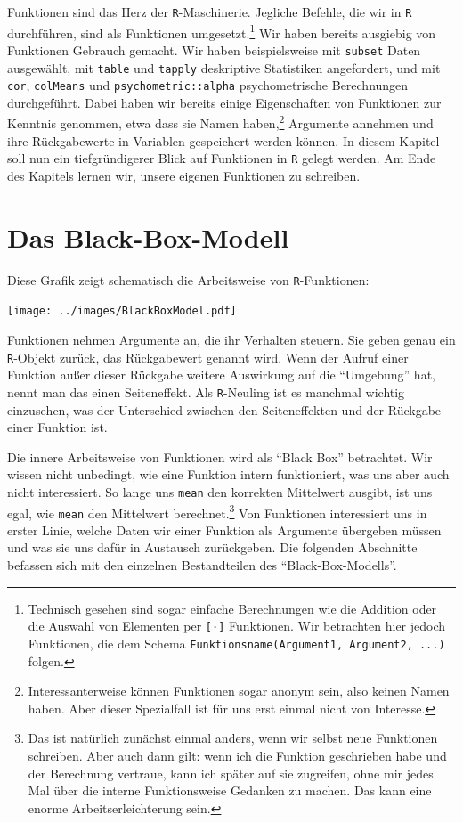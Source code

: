 \documentclass[12pt,]{tufte-book}
\theoremstyle{definition}
\theoremstyle{definition}
\theoremstyle{definition}
\theoremstyle{remark}
\begin{document}
Funktionen sind das Herz der \texttt{R}-Maschinerie. Jegliche Befehle,
die wir in \texttt{R} durchführen, sind als Funktionen
umgesetzt.\footnote{Technisch gesehen sind sogar einfache Berechnungen
  wie die Addition oder die Auswahl von Elementen per \texttt{{[}·{]}}
  Funktionen. Wir betrachten hier jedoch Funktionen, die dem Schema
  \texttt{Funktionsname(Argument1,\ Argument2,\ ...)} folgen.} Wir haben
bereits ausgiebig von Funktionen Gebrauch gemacht. Wir haben
beispielsweise mit \texttt{subset} Daten ausgewählt, mit \texttt{table}
und \texttt{tapply} deskriptive Statistiken angefordert, und mit
\texttt{cor}, \texttt{colMeans} und \texttt{psychometric::alpha}
psychometrische Berechnungen durchgeführt. Dabei haben wir bereits
einige Eigenschaften von Funktionen zur Kenntnis genommen, etwa dass sie
Namen haben,\footnote{Interessanterweise können Funktionen sogar anonym
  sein, also keinen Namen haben. Aber dieser Spezialfall ist für uns
  erst einmal nicht von Interesse.} Argumente annehmen und ihre
Rückgabewerte in Variablen gespeichert werden können. In diesem Kapitel
soll nun ein tiefgründigerer Blick auf Funktionen in \texttt{R} gelegt
werden. Am Ende des Kapitels lernen wir, unsere eigenen Funktionen zu
schreiben.

\section{Das Black-Box-Modell}\label{das-black-box-modell}

Diese Grafik zeigt schematisch die Arbeitsweise von
\texttt{R}-Funktionen:

\begin{center}
\texttt{[image: ../images/BlackBoxModel.pdf]}
\end{center}

Funktionen nehmen Argumente an, die ihr Verhalten steuern. Sie geben
genau ein \texttt{R}-Objekt zurück, das Rückgabewert genannt wird. Wenn
der Aufruf einer Funktion außer dieser Rückgabe weitere Auswirkung auf
die ``Umgebung'' hat, nennt man das einen Seiteneffekt. Als
\texttt{R}-Neuling ist es manchmal wichtig einzusehen, was der
Unterschied zwischen den Seiteneffekten und der Rückgabe einer Funktion
ist.

Die innere Arbeitsweise von Funktionen wird als ``Black Box''
betrachtet. Wir wissen nicht unbedingt, wie eine Funktion intern
funktioniert, was uns aber auch nicht interessiert. So lange uns
\texttt{mean} den korrekten Mittelwert ausgibt, ist uns egal, wie
\texttt{mean} den Mittelwert berechnet.\footnote{Das ist natürlich
  zunächst einmal anders, wenn wir selbst neue Funktionen schreiben.
  Aber auch dann gilt: wenn ich die Funktion geschrieben habe und der
  Berechnung vertraue, kann ich später auf sie zugreifen, ohne mir jedes
  Mal über die interne Funktionsweise Gedanken zu machen. Das kann eine
  enorme Arbeitserleichterung sein.} Von Funktionen interessiert uns in
erster Linie, welche Daten wir einer Funktion als Argumente übergeben
müssen und was sie uns dafür in Austausch zurückgeben. Die folgenden
Abschnitte befassen sich mit den einzelnen Bestandteilen des
``Black-Box-Modells''.
\end{document}
